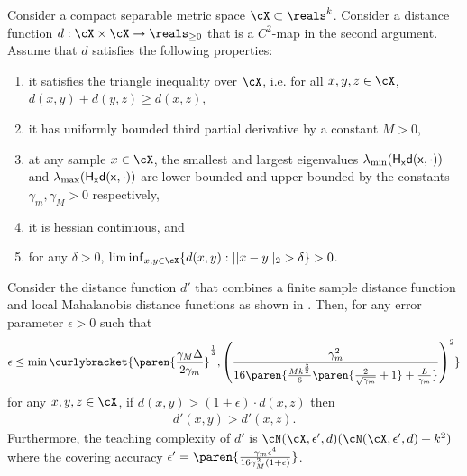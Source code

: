 \begin{theorem}\label{thm: smoothl2} Consider a compact separable metric space $\cX \subset \reals^k$. Consider a distance function $d: \cX \times \cX \to \reals_{\ge 0}$ that is a $C^2$-map in the second argument. Assume that $d$ satisfies the following properties:
\begin{enumerate}
    \item it satisfies the triangle inequality over $\cX$, i.e. for all $x,y,z \in \cX$, $d(x,y) + d(y,z) \ge d(x,z)$,
    \item it has uniformly bounded third partial derivative by a constant $M > 0$, 
    \item at any sample $x \in \cX$, the smallest and largest eigenvalues $\lambda_{\min}(\sf{H}_x d(x,\cdot))$ and $\lambda_{\max}(\sf{H}_x d(x,\cdot))$ are lower bounded and upper bounded by the constants $\gamma_m, \gamma_M > 0$ respectively, 
    \item it is hessian continuous, and
    \item for any $\delta > 0$, $\liminf_{x,y \in \cX  } \{d(x,y) : ||x-y||_2 > \delta\} > 0$. 
\end{enumerate}

Consider the distance function $d'$ that combines a finite sample distance function and local Mahalanobis distance functions as shown in . Then, for any error parameter $\epsilon > 0$ such that
\begin{align*}
    \epsilon \le \min\curlybracket{\paren{\frac{\gamma_M \Delta}{2 \gamma_m}}^{\frac{1}{3}}, \left(\frac{\gamma_m^2}{16\paren{\frac{M k^{\frac{3}{2}}}{6}\paren{\frac{2}{\sqrt{\gamma_m}} + 1} + \frac{L}{\gamma_m}}}\right)^2}
\end{align*}
for any $x,y,z \in \cX$, if $d(x,y) > (1 + \epsilon)\cdot d(x,z)$ then
\begin{align*}
    d'(x,y) > d'(x,z).
\end{align*}
Furthermore, the teaching complexity of $d'$ is $\cN(\cX, \epsilon', d) (\cN(\cX, \epsilon', d) + k^2)$ where the covering accuracy $\epsilon' = \paren{\frac{\gamma_m \epsilon^4}{16\gamma_M^2 (1 + \epsilon)}}$.
\end{theorem}



